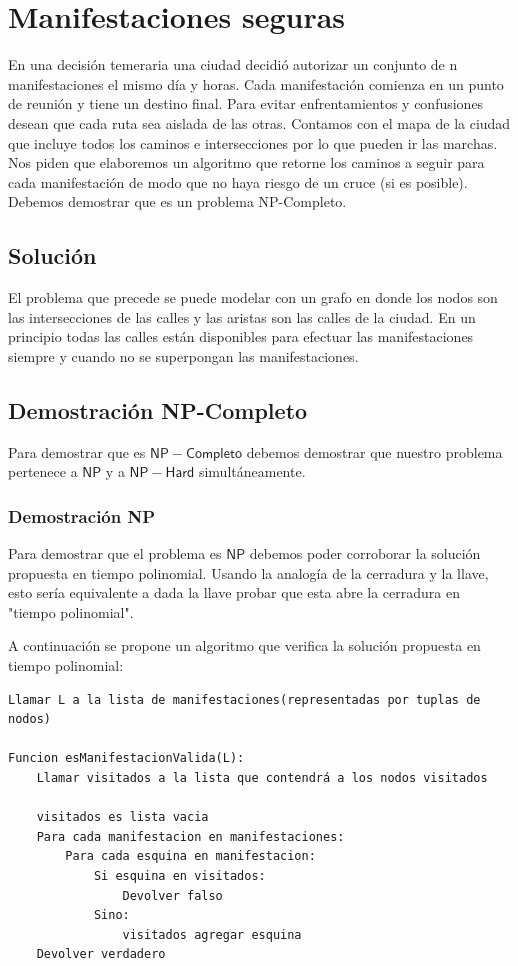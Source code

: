  \section{Manifestaciones seguras}

En una decisión temeraria una ciudad decidió autorizar un conjunto de n manifestaciones el mismo día y horas. Cada manifestación comienza en un punto de reunión y tiene un destino final. Para evitar enfrentamientos y confusiones desean que cada ruta sea aislada de las otras. Contamos con el mapa de la ciudad que incluye todos los caminos e intersecciones por lo que pueden ir las marchas. Nos piden que elaboremos un algoritmo que retorne los caminos a seguir para cada manifestación de modo que no haya riesgo de un cruce (si es posible).\newline
Debemos demostrar que es un problema NP-Completo.

\subsection{Solución}
El problema que precede se puede modelar con un grafo en donde los nodos son las intersecciones de las calles y las aristas son las calles de la ciudad. En un principio todas las calles están disponibles para efectuar las manifestaciones siempre y cuando no se superpongan las manifestaciones.

\subsection{Demostración NP-Completo}
Para demostrar que es $\mathsf{NP-Completo}$ debemos demostrar que nuestro problema pertenece a $\mathsf{NP}$ y a $\mathsf{NP-Hard}$ simultáneamente.

\subsubsection{Demostración NP}
Para demostrar que el problema es $\mathsf{NP}$ debemos poder corroborar la solución propuesta en tiempo polinomial. Usando la analogía de la cerradura y la llave, esto sería equivalente a dada la llave probar que esta abre la cerradura en "tiempo polinomial". \newline

A continuación se propone un algoritmo que verifica la solución propuesta en tiempo polinomial:

\begin{verbatim}
Llamar L a la lista de manifestaciones(representadas por tuplas de nodos)

Funcion esManifestacionValida(L):
    Llamar visitados a la lista que contendrá a los nodos visitados
    
    visitados es lista vacia
    Para cada manifestacion en manifestaciones:
        Para cada esquina en manifestacion:
            Si esquina en visitados:
                Devolver falso
            Sino:
                visitados agregar esquina
    Devolver verdadero
\end{verbatim}

